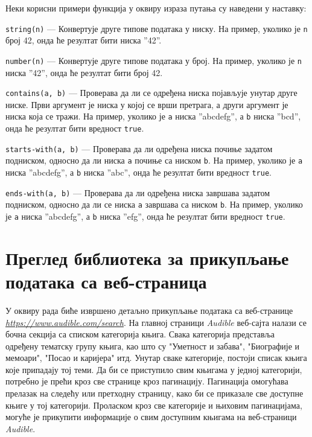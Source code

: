 \documentclass[12pt,oneside]{memoir}
\begin{document}
Неки корисни примери функција у оквиру израза путања су наведени у наставку:
\begin{description}
\item \texttt{string(n)} --- Конвертује друге типове података у ниску. На пример, уколико је \texttt{n} број 42, онда ће резултат бити ниска ''42''.
\item \texttt{number(n)} --- Конвертује друге типове података у број. На пример, уколико је \texttt{n} ниска ''42'', онда ће резултат бити број 42.
\item \texttt{contains(a, b)} --- Проверава да ли се одређена ниска појављује унутар друге ниске. Први аргумент је ниска у којој се врши претрага, а други аргумент је ниска која се тражи. На пример, уколико је \texttt{a} ниска ''abcdefg'', а \texttt{b} ниска ''bcd'', онда ће резултат бити вредност \texttt{true}.
\item \texttt{starts-with(a, b)} --- Проверава да ли одређена ниска почиње задатом подниском, односно да ли ниска \texttt{a} почиње са ниском \texttt{b}.
На пример, уколико је \texttt{a} ниска ''abcdefg'', а \texttt{b} ниска ''abc'', онда ће резултат бити вредност \texttt{true}.
\item \texttt{ends-with(a, b)} --- Проверава да ли одређена ниска завршава задатом подниском, односно да ли се ниска \texttt{a} завршава са ниском \texttt{b}.
На пример, уколико је \texttt{a} ниска ''abcdefg'', а \texttt{b} ниска ''efg'', онда ће резултат бити вредност \texttt{true}.
\end{description}
\chapter{Преглед библиотека за прикупљање података са веб-страница}
\label{chp:alati}
У оквиру рада биће извршено детаљно прикупљање података са веб-странице \textit{\href{https://www.audible.com/search}{https://www.audible.com/search}}. На главној страници \textit{Audible} веб-сајта налази се бочна секција са списком категорија књига. Свака категорија представља одређену тематску групу књига, као што су "Уметност и забава", "Биографије и мемоари", "Посао и каријера" итд. Унутар сваке категорије, постоји списак књига које припадају тој теми. Да би се приступило свим књигама у једној категорији, потребно је прећи кроз све странице кроз пагинацију. Пагинација омогућава прелазак на следећу или претходну страницу, како би се приказале све доступне књиге у тој категорији. Проласком кроз све категорије и њиховим пагинацијама, могуће је прикупити информације о свим доступним књигама на  веб-страници \textit{Audible}.
\end{document}
